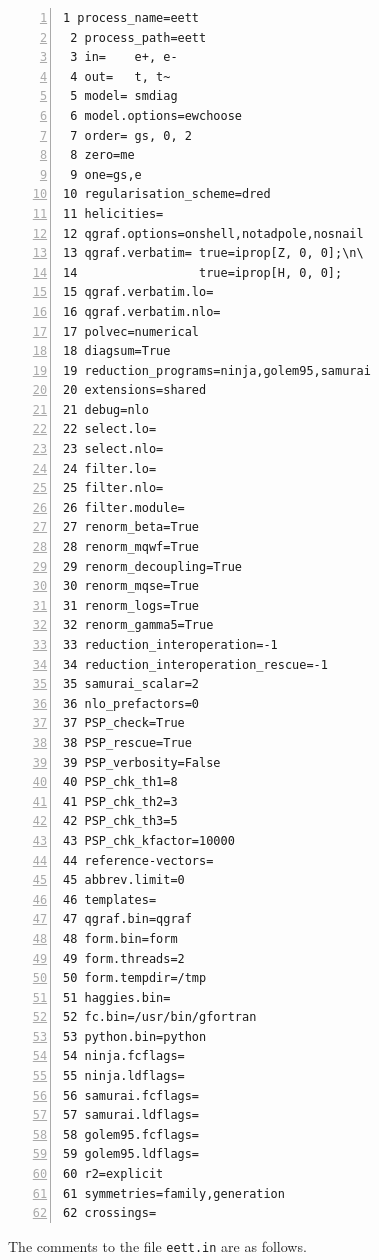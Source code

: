 \documentclass[11pt,a4paper]{refrep}
\begin{document}
\begin{lstlisting}[gobble=3,%
     numbers=left,caption={{\tt eett.in}},%
     basicstyle=\ttfamily]
 1 process_name=eett
 2 process_path=eett
 3 in=    e+, e-
 4 out=   t, t~
 5 model= smdiag
 6 model.options=ewchoose
 7 order= gs, 0, 2
 8 zero=me
 9 one=gs,e
10 regularisation_scheme=dred
11 helicities=
12 qgraf.options=onshell,notadpole,nosnail
13 qgraf.verbatim= true=iprop[Z, 0, 0];\n\
14                 true=iprop[H, 0, 0];
15 qgraf.verbatim.lo=
16 qgraf.verbatim.nlo=
17 polvec=numerical
18 diagsum=True
19 reduction_programs=ninja,golem95,samurai
20 extensions=shared
21 debug=nlo
22 select.lo=
23 select.nlo=
24 filter.lo=
25 filter.nlo=
26 filter.module=
27 renorm_beta=True
28 renorm_mqwf=True
29 renorm_decoupling=True
30 renorm_mqse=True
31 renorm_logs=True
32 renorm_gamma5=True
33 reduction_interoperation=-1
34 reduction_interoperation_rescue=-1
35 samurai_scalar=2
36 nlo_prefactors=0
37 PSP_check=True
38 PSP_rescue=True
39 PSP_verbosity=False
40 PSP_chk_th1=8
41 PSP_chk_th2=3
42 PSP_chk_th3=5
43 PSP_chk_kfactor=10000
44 reference-vectors=
45 abbrev.limit=0
46 templates=
47 qgraf.bin=qgraf
48 form.bin=form
49 form.threads=2
50 form.tempdir=/tmp
51 haggies.bin=
52 fc.bin=/usr/bin/gfortran
53 python.bin=python
54 ninja.fcflags=
55 ninja.ldflags=
56 samurai.fcflags=
57 samurai.ldflags=
58 golem95.fcflags=
59 golem95.ldflags=
60 r2=explicit
61 symmetries=family,generation
62 crossings=
\end{lstlisting}

The comments to the file {\tt eett.in} are as follows. 
\end{document}
